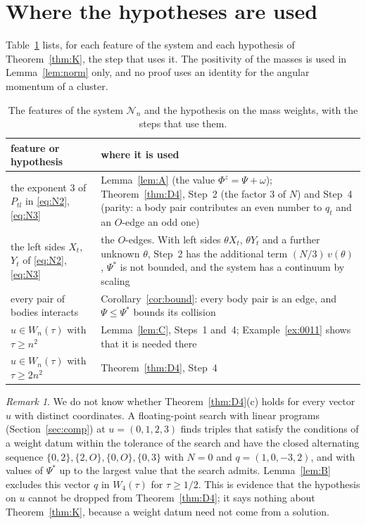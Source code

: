 \documentclass[11pt]{amsart}
\theoremstyle{definition}
\theoremstyle{remark}
\newtheorem{remark}[theorem]{Remark}
\numberwithin{equation}{section}
\newcommand{\cN}{\mathcal{N}}
\newcommand{\Ps}{\Psi^{*}}
\begin{document}
\section{Where the hypotheses are used}\label{sec:hyp}

Table~\ref{tab:hyp} lists, for each feature of the system and each hypothesis of Theorem~\ref{thm:K}, the
step that uses it. The positivity of the masses is used in Lemma~\ref{lem:norm} only, and no proof uses an identity for the
angular momentum of a cluster.

\begin{table}[ht]
\caption{The features of the system $\cN_n$ and the hypothesis on the mass weights, with the steps that
use them.}\label{tab:hyp}
\small
\begin{tabular}{@{}>{\raggedright}p{}>{\raggedright\arraybackslash}p{}@{}}
\toprule
feature or hypothesis & where it is used \\
\midrule
the exponent $3$ of $P_{tl}$ in \eqref{eq:N2}, \eqref{eq:N3} & Lemma~\ref{lem:A} (the value $\Phi^z = \Psi + \omega$); Theorem~\ref{thm:D4}, Step~2 (the factor $3$ of $N$) and Step~4 (parity: a body pair contributes an even number to $q_t$ and an $O$-edge an odd one) \\
the left sides $X_t$, $Y_t$ of \eqref{eq:N2}, \eqref{eq:N3} & the $O$-edges. With left sides $\theta X_t$, $\theta Y_t$ and a further unknown $\theta$, Step~2 has the additional term $(N/3)\, v(\theta)$, $\Ps$ is not bounded, and the system has a continuum by scaling \\
every pair of bodies interacts & Corollary~\ref{cor:bound}: every body pair is an edge, and $\Psi \le \Ps$ bounds its collision \\
$u \in W_n(\tau)$ with $\tau \ge n^2$ & Lemma~\ref{lem:C}, Steps~1 and~4; Example~\ref{ex:0011} shows that it is needed there \\
$u \in W_n(\tau)$ with $\tau \ge 2n^2$ & Theorem~\ref{thm:D4}, Step~4 \\
\bottomrule
\end{tabular}
\end{table}

\begin{remark}\label{rem:u0123}
We do not know whether Theorem~\ref{thm:D4}(c) holds for every vector $u$ with distinct coordinates. A
floating-point search with linear programs (Section~\ref{sec:comp}) at $u = (0, 1, 2, 3)$ finds triples
that satisfy the conditions of a weight datum within the tolerance of the search and have the closed
alternating sequence
$\{0, 2\}, \{2, O\}, \{0, O\}, \{0, 3\}$ with $N = 0$ and $q = (1, 0, -3, 2)$, and with values of $\Ps$
up to the largest value that the search admits. Lemma~\ref{lem:B} excludes this vector $q$ in $W_4(\tau)$ for
$\tau \ge 1/2$. This is evidence that the hypothesis on $u$ cannot be dropped from
Theorem~\ref{thm:D4}; it says nothing about Theorem~\ref{thm:K}, because a weight datum need not come
from a solution.
\end{remark}
\end{document}
